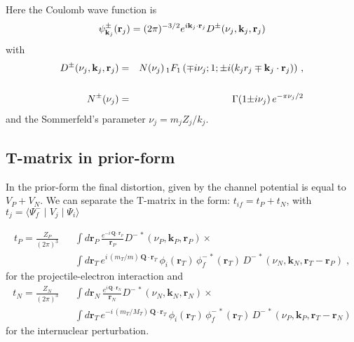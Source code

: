 Here the Coulomb wave function is
\begin{equation}\label{Q:FCC} 
\psi^{\pm}_{{\bf k}_j}({\bf r}_j)  = (2\pi)^{-3/2}e^{i{\bf
k}_j \cdot {\bf r}_j} D^{\pm}(\nu_j,{\bf k}_j,{\bf r}_j)
\end{equation}
%
with
%
\begin{eqnarray}\label{Q:NNorm}
D^{\pm}(\nu_j,{\bf k}_j,{\bf r}_j) &=& N(\nu_j) \,{_1F_1}\left( \mp i
\nu_j;1; {\pm} i(k_j r_j \mp {\bf k}_j\cdot{\bf r}_j ) \right) \, ,\\
\nonumber \\ 
 N^{\pm}(\nu_j)&=& \Gamma(1 {\pm} i\nu_j)\, e^{-\pi \nu_j/2}
\end{eqnarray}
%
and the Sommerfeld's parameter $\nu_j = m_j Z_j/ k_j$.

\subsection{T-matrix in prior-form}
In the prior-form the final distortion, given by the channel potential
is equal to $V_{P} + V_{N}$. We can separate the T-matrix in the form:
$t_{if} = t_{P} + t_{N}$, with $t_{j} = \langle \Psi_{f}^{-}\mid
V_j\mid \Psi_{i} \rangle $

\begin{eqnarray} \label{QA2:6}
t_{P} = \frac{Z_{P}}{(2 \pi)^{3}} && \int d \bm{r}_{P} \,
   \frac{e^{- i \, \bm{Q} \cdot \bm{r}_{P}}}{\bm{r}_{P}}
D^{-\,\ast}(\nu_{P},\bm{k}_{P},\bm{r}_{P}) {\times}
\\
& & \int d \bm{r}_{T} \, e^{i \, (m_{T}/m) \, \bm{Q} \cdot
\bm{r}_T} \, \phi_{i}(\bm{r}_T) \, \phi^{-\, \ast}_{f}(\bm{r}_T) \,
D^{-\,\ast}(\nu_{N}, \bm{k}_{N}, \bm{r}_{T} - \bm{r}_{P} ) \;,
\nonumber
\end{eqnarray}
%
for the projectile-electron interaction and
%
\begin{eqnarray}\label{QA2:7}
t_{N} = \frac{Z_{N}}{(2 \pi)^{3}} & & \int d \bm{r}_{N} \,
   \frac{e^{ i \, \bm{Q} \cdot \bm{r}_{N}}}{\bm{r}_{N}}
D^{-\,\ast}(\nu_{N},\bm{k}_{N},\bm{r}_{N}) {\times}
\\
 & & \int d \bm{r}_T \,
e^{- i \, (m_{T}/M_{T}) \, \bm{Q} \cdot \bm{r}_T} \,
\phi_{i}(\bm{r}_{T})\, \phi^{-\, \ast}_{f}(\bm{r}_T) \,
D^{-\,\ast}(\nu_{P}, \bm{k}_{P}, \bm{r}_{T} - \bm{r}_{N} ) \nonumber
\end{eqnarray}
for the internuclear perturbation.

